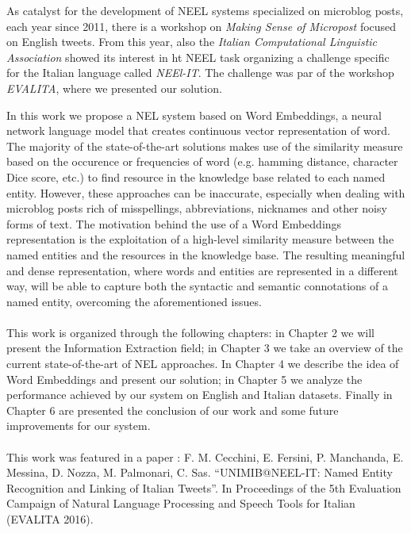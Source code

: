 As catalyst for the development of NEEL systems specialized on microblog posts, each year since 2011, there is a workshop on \textit{Making Sense of Micropost} focused on English tweets. From this year, also the \textit{Italian Computational Linguistic Association} showed its interest in ht NEEL task organizing a challenge specific for the Italian language called \textit{NEEl-IT}. The challenge was par of the workshop \textit{EVALITA}, where we presented our solution.


In this work we propose a NEL system based on Word Embeddings, a neural network language model that creates continuous vector representation of word. The majority of the state-of-the-art solutions makes use of the similarity measure based on the occurence or frequencies of word (e.g. hamming distance, character Dice score, etc.) to find resource in the knowledge base related to each named entity. However, these approaches can be inaccurate, especially when dealing with microblog posts rich of misspellings, abbreviations, nicknames and other noisy forms of text. The motivation behind the use of a Word Embeddings representation is the exploitation of a high-level similarity measure between the named entities and the resources in the knowledge base. The resulting meaningful and dense representation, where words and entities are represented in a different way, will be able to capture both the syntactic and semantic connotations of a named entity, overcoming the aforementioned issues.

\paragraph{}
This work is organized through the following chapters: in Chapter 2 we will present the Information Extraction field; in Chapter 3 we take an overview of the current state-of-the-art of NEL approaches. In Chapter 4 we describe the idea of Word Embeddings and present our solution; in Chapter 5 we analyze the performance achieved by our system on English and Italian datasets. Finally in Chapter 6 are presented the conclusion of our work and some future improvements for our system.

\paragraph{}
This work was featured in a paper \cite{cecchiniunimib}: F. M. Cecchini, E. Fersini, P. Manchanda, E. Messina, D. Nozza, M. Palmonari, C. Sas. “UNIMIB@NEEL-IT: Named Entity Recognition and Linking of Italian Tweets”. In Proceedings of the 5th Evaluation Campaign of Natural Language Processing and Speech Tools for Italian (EVALITA 2016). 




